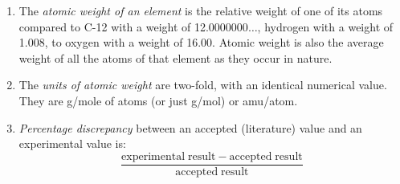\documentclass[
	a4paper, %
	12pt, %
]{CSUniSchoolLabReport}
\begin{document}



\begin{enumerate}
	\item The \textit{atomic weight of an element} is the relative weight of one of its atoms compared to C-12 with a weight of 12.0000000$\ldots$, hydrogen with a weight of 1.008, to oxygen with a weight of 16.00. Atomic weight is also the average weight of all the atoms of that element as they occur in nature.
	\item The \textit{units of atomic weight} are two-fold, with an identical numerical value. They are g/mole of atoms (or just g/mol) or amu/atom.
	\item \textit{Percentage discrepancy} between an accepted (literature) value and an experimental value is:
		\begin{equation*}
			\frac{\mathrm{experimental\;result} - \mathrm{accepted\;result}}{\mathrm{accepted\;result}}
		\end{equation*}
\end{enumerate}

\end{document}
